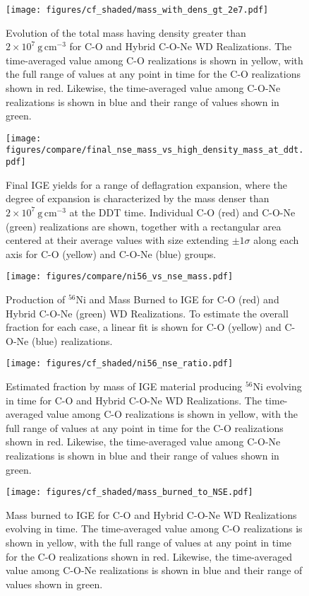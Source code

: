 \documentclass[iop,apj]{emulateapj}
\newcommand{\unitspace}{\ensuremath{\,}}
\newcommand{\usp}{\unitspace}
\newcommand{\unitstyle}[1]{\ensuremath{\mathrm{#1}}}
\newcommand{\power}[2]{\ensuremath{{#1}^{#2}}}
\newcommand{\centi}{\unitstyle{c}}
\newcommand{\meter}{\unitstyle{m}}
\newcommand{\cm}{\centi\meter}
\newcommand{\gram}{\unitstyle{g}}
\newcommand{\grampercc}{\gram\usp\power{\cm}{-3}} %
\begin{document}
\begin{figure}[!ht]
	\texttt{[image: figures/cf\_shaded/mass\_with\_dens\_gt\_2e7.pdf]}
	\caption{\label{fig:mass_dens_lt_2e7} Evolution of the total mass having density greater than $2 \times 10^7~\grampercc$ for C-O and Hybrid C-O-Ne WD Realizations. The time-averaged value among C-O realizations is shown in yellow, with the full range of values at any point in time for the C-O realizations shown in red. Likewise, the time-averaged value among C-O-Ne realizations is shown in blue and their range of values shown in green.}
\end{figure}

\begin{figure}[!ht]
	\texttt{[image: figures/compare/final\_nse\_mass\_vs\_high\_density\_mass\_at\_ddt.pdf]}
	\caption{\label{fig:ige_vs_highrho_ddt} Final IGE yields for a range of deflagration expansion, where the degree of expansion is characterized by the mass denser than $2\times 10^7~\grampercc$ at the DDT time. Individual C-O (red) and C-O-Ne (green) realizations are shown, together with a rectangular area centered at their average values with size extending $\pm 1 \sigma$ along each axis for C-O (yellow) and C-O-Ne (blue) groups.}
\end{figure}

\begin{figure}[!ht]
	\texttt{[image: figures/compare/ni56\_vs\_nse\_mass.pdf]}
	\caption{\label{fig:ni56_vs_nse_mass} Production of $^{56}$Ni and Mass Burned to IGE for C-O (red) and Hybrid C-O-Ne (green) WD Realizations. To estimate the overall fraction for each case, a linear fit is shown for C-O (yellow) and C-O-Ne (blue) realizations.}
\end{figure}

\begin{figure}[!ht]
	\texttt{[image: figures/cf\_shaded/ni56\_nse\_ratio.pdf]}
	\caption{\label{fig:ni56_nse_mass_ratio} Estimated fraction by mass of IGE material producing $^{56}$Ni evolving in time for C-O and Hybrid C-O-Ne WD Realizations. The time-averaged value among C-O realizations is shown in yellow, with the full range of values at any point in time for the C-O realizations shown in red. Likewise, the time-averaged value among C-O-Ne realizations is shown in blue and their range of values shown in green.}
\end{figure}

\begin{figure}[!ht]
	\texttt{[image: figures/cf\_shaded/mass\_burned\_to\_NSE.pdf]}
	\caption{\label{fig:nse_burn_mass} Mass burned to IGE for C-O and Hybrid C-O-Ne WD Realizations evolving in time. The time-averaged value among C-O realizations is shown in yellow, with the full range of values at any point in time for the C-O realizations shown in red. Likewise, the time-averaged value among C-O-Ne realizations is shown in blue and their range of values shown in green.}
\end{figure}
\end{document}
